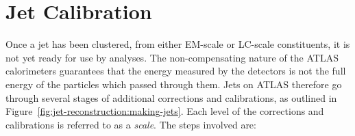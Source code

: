 

\section{Jet Calibration}

Once a jet has been clustered, from either EM-scale or LC-scale constituents, it is not yet ready for use by analyses. The non-compensating nature of the ATLAS calorimeters guarantees that the energy measured by the detectors is not the full energy of the particles which passed through them. Jets on ATLAS therefore go through several stages of additional corrections and calibrations, as outlined in Figure~\ref{fig:jet-reconstruction:making-jets}. Each level of the corrections and calibrations is referred to as a \textit{scale}. The steps involved are:

